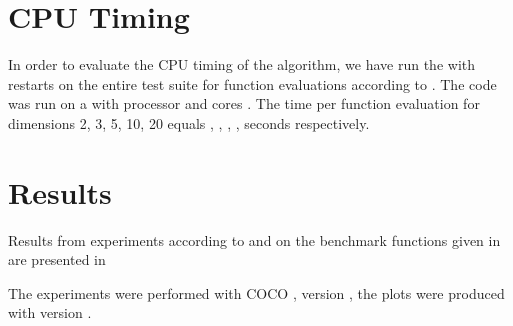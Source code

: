 \documentclass[sigconf]{acmart}
\begin{document}
\section{CPU Timing}
In order to evaluate the CPU timing of the algorithm, we have run the \change{\algorithmA} with restarts on the entire \bbob test suite \cite{hansen2009fun} for  function evaluations according to \cite{hansen2016exp}.
 The  code was run on a  with  processor and  cores . The time per function evaluation for dimensions 2, 3, 5, 10, 20 equals , , , ,  seconds respectively. 


\section{Results}

Results from experiments according to \cite{hansen2016exp} and
\cite{hansen2022perfass} on the benchmark functions given in 
{\cite{wp200901_2010}} are presented in


The experiments were performed with COCO \cite{hansen2020cocoplat}, version
\change{\version}, the plots were produced with version \change{\version}.
\end{document}
